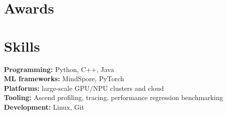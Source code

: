 \documentclass[a4paper,9pt]{article}
\begin{document}
\begin{minipage}[t]{0.33\textwidth}
\section*{Awards}
\CompactListStart
\CompactListEnd

\section*{Skills}
{\fontsize{7.8pt}{8.4pt}\selectfont
\textbf{Programming:} Python, C++, Java\\
\textbf{ML frameworks:} MindSpore, PyTorch\\
\textbf{Platforms:} large-scale GPU/NPU clusters and cloud\\
\textbf{Tooling:} Ascend profiling, tracing, performance regression benchmarking\\
\textbf{Development:} Linux, Git}
\end{minipage}
\end{document}
